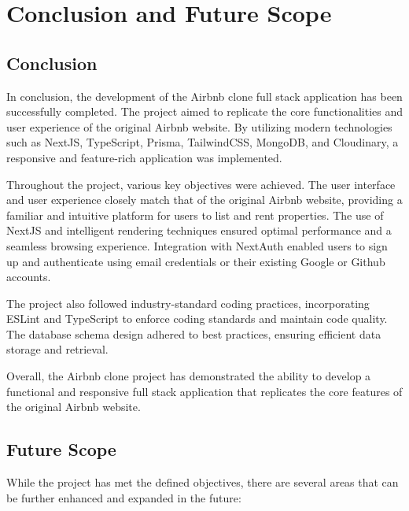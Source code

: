 \chapter{Conclusion and Future Scope}

\section{Conclusion}
In conclusion, the development of the Airbnb clone full stack application has been successfully completed. The project aimed to replicate the core functionalities and user experience of the original Airbnb website. By utilizing modern technologies such as NextJS, TypeScript, Prisma, TailwindCSS, MongoDB, and Cloudinary, a responsive and feature-rich application was implemented.

Throughout the project, various key objectives were achieved. The user interface and user experience closely match that of the original Airbnb website, providing a familiar and intuitive platform for users to list and rent properties. The use of NextJS and intelligent rendering techniques ensured optimal performance and a seamless browsing experience. Integration with NextAuth enabled users to sign up and authenticate using email credentials or their existing Google or Github accounts.

The project also followed industry-standard coding practices, incorporating ESLint and TypeScript to enforce coding standards and maintain code quality. The database schema design adhered to best practices, ensuring efficient data storage and retrieval.

Overall, the Airbnb clone project has demonstrated the ability to develop a functional and responsive full stack application that replicates the core features of the original Airbnb website.

\section{Future Scope}
While the project has met the defined objectives, there are several areas that can be further enhanced and expanded in the future:

